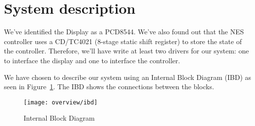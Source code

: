 \section{System description}

We've identified the Display as a PCD8544. We've also found out that the NES controller uses a CD/TC4021 (8-stage static shift register) to store the state of the controller. Therefore, we'll have write at least two drivers for our system: one to interface the display and one to interface the controller.

We have chosen to describe our system using an Internal Block Diagram (IBD) as seen in Figure~\ref{fig:ibd}. The IBD shows the connections between the blocks.

\begin{figure}
\centering
\texttt{[image: overview/ibd]}
\caption{Internal Block Diagram}
\label{fig:ibd}
\end{figure}




